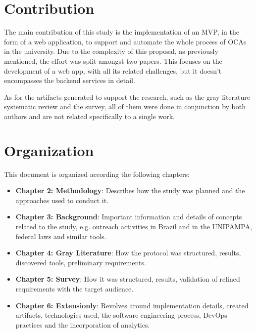 \section{Contribution}\label{sec:contribution}

The main contribution of this study is the implementation of an \ac{MVP}, in the form of a web application, to support and automate the whole process of \aclp{OCA} in the university. Due to the complexity of this proposal, as previously mentioned, the effort was split amongst two papers. This focuses on the development of a web app, with all its related challenges, but it doesn't encompasses the backend services in detail.

As for the artifacts generated to support the research, such as the gray literature systematic review and the survey, all of them were done in conjunction by both authors and are not related specifically to a single work.

\section{Organization}\label{sec:organization}

This document is organized according the following chapters:

\begin{itemize}
    \item \textbf{Chapter 2: Methodology}: Describes how the study was planned and the approaches used to conduct it.
    \item \textbf{Chapter 3: Background}: Important information and details of concepts related to the study, e.g. outreach activities in Brazil and in the \acl{UNIPAMPA}, federal laws and similar tools.
    \item \textbf{Chapter 4: Gray Literature}: How the protocol was structured, results, discovered tools, preliminary requirements.
    \item \textbf{Chapter 5: Survey}: How it was structured, results, validation of refined requirements with the target audience.
    \item \textbf{Chapter 6: Extensionly}: Revolves around implementation details, created artifacts, technologies used, the software engineering process, DevOps practices and the incorporation of analytics.
\end{itemize}

